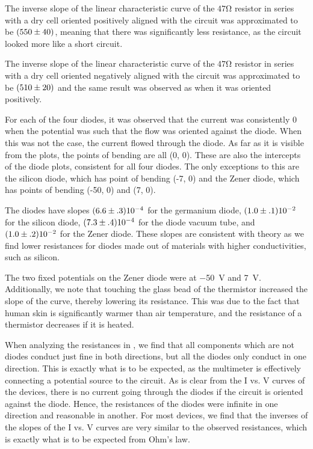 \begin{paper}
	The inverse slope of the linear characteristic curve of the \( 47 \si{\ohm} \) resistor in series with a dry cell oriented positively aligned with the circuit was approximated to be \( \left(550 \pm 40 \right) \), meaning that there was significantly less resistance, as the circuit looked more like a short circuit.
	
	The inverse slope of the linear characteristic curve of the \( 47 \si{\ohm} \) resistor in series with a dry cell oriented negatively aligned with the circuit was approximated to be \( \left(510 \pm 20 \right) \) and the same result was observed as when it was oriented positively.
	
	For each of the four diodes, it was observed that the current was consistently 0 when the potential was such that the flow was oriented against the diode. When this was not the case, the current flowed through the diode. As far as it is visible from the plots, the points of bending are all (0, 0). These are also the intercepts of the diode plots, consistent for all four diodes. The only exceptions to this are the silicon diode, which has point of bending (-7, 0) and the Zener diode, which has points of bending (-50, 0) and (7, 0).
	
	The diodes have slopes $(6.6\pm.3)\SI{E-4}{}$ for the germanium diode, $(1.0\pm.1)\SI{E-2}{}$ for the silicon diode, $(7.3\pm.4)\SI{E-4}{}$ for the diode vacuum tube, and $(1.0\pm.2)\SI{E-2}{}$ for the Zener diode. These slopes are consistent with theory as we find lower resistances for diodes made out of materials with higher conductivities, such as silicon.
	
	The two fixed potentials on the Zener diode were at \SI{-50}{\volt} and \SI{7}{\volt}. Additionally, we note that touching the glass bead of the thermistor increased the slope of the curve, thereby lowering its resistance. This was due to the fact that human skin is significantly warmer than air temperature, and the resistance of a thermistor decreases if it is heated.
	
	When analyzing the resistances in \figResistances, we find that all components which are not diodes conduct just fine in both directions, but all the diodes only conduct in one direction. This is exactly what is to be expected, as the multimeter is effectively connecting a potential source to the circuit. As is clear from the I vs. V curves of the devices, there is no current going through the diodes if the circuit is oriented against the diode. Hence, the resistances of the diodes were infinite in one direction and reasonable in another. For most devices, we find that the inverses of the slopes of the I vs. V curves are very similar to the observed resistances, which is exactly what is to be expected from Ohm's law.
	

\end{paper}
